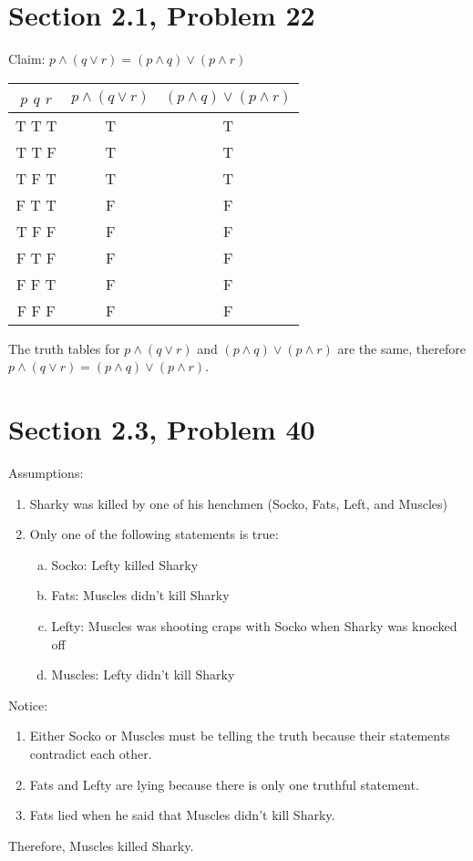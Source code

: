 \documentclass{article}
\begin{document}
\section*{Section 2.1, Problem 22}
Claim: $p \wedge (q \lor r) = (p \wedge q) \lor (p \wedge r)$
\begin{center}
	\begin{tabular}{|c c c|} 
		\hline
		$p$ $q$ $r$ & $p \wedge (q \lor r)$ & $(p \wedge q) \lor (p \wedge r)$ \\ [1ex] 
		\hline
		T T T & T & T \\ 
		\hline
		T T F & T & T \\
		\hline
		T F T & T & T \\
		\hline
		F T T & F & F \\ 
		\hline
		T F F & F & F \\
		\hline
		F T F & F & F \\
		\hline
		F F T & F & F \\
		\hline
		F F F & F & F \\
		\hline
	\end{tabular}
\end{center}
The truth tables for $p \wedge (q \lor r)$ and $(p \wedge q) \lor (p \wedge r)$ are the same, therefore $p \wedge (q \lor r) = (p \wedge q) \lor (p \wedge r)$.

\clearpage
\header
\section*{Section 2.3, Problem 40}
Assumptions:
\begin{enumerate}
	\item Sharky was killed by one of his henchmen (Socko, Fats, Left, and Muscles)
	\item Only one of the following statements is true:
		\begin{enumerate}[(a)]
			\item Socko: Lefty killed Sharky
			\item Fats: Muscles didn't kill Sharky
			\item Lefty: Muscles was shooting craps with Socko when Sharky was knocked off
			\item Muscles: Lefty didn't kill Sharky
		\end{enumerate}
\end{enumerate}
Notice:
\begin{enumerate}
	\item Either Socko or Muscles must be telling the truth because their statements contradict each other.
	\item Fats and Lefty are lying because there is only one truthful statement.
	\item Fats lied when he said that Muscles didn't kill Sharky.
\end{enumerate}
Therefore, Muscles killed Sharky.
\end{document}
